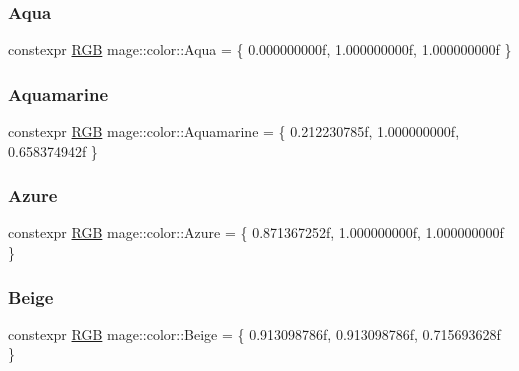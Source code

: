 \subsubsection{\texorpdfstring{Aqua}{Aqua}}
{\footnotesize\ttfamily constexpr \hyperlink{structmage_1_1_r_g_b}{R\+GB} mage\+::color\+::\+Aqua = \{ 0.\+000000000f, 1.\+000000000f, 1.\+000000000f \}}

\hypertarget{namespacemage_1_1color_aeb7c11e0c59678c6ddcc4e8379c5a951}{}\label{namespacemage_1_1color_aeb7c11e0c59678c6ddcc4e8379c5a951} 
\subsubsection{\texorpdfstring{Aquamarine}{Aquamarine}}
{\footnotesize\ttfamily constexpr \hyperlink{structmage_1_1_r_g_b}{R\+GB} mage\+::color\+::\+Aquamarine = \{ 0.\+212230785f, 1.\+000000000f, 0.\+658374942f \}}

\hypertarget{namespacemage_1_1color_a002c51cadb3b21c6a0c3492303207ee3}{}\label{namespacemage_1_1color_a002c51cadb3b21c6a0c3492303207ee3} 
\subsubsection{\texorpdfstring{Azure}{Azure}}
{\footnotesize\ttfamily constexpr \hyperlink{structmage_1_1_r_g_b}{R\+GB} mage\+::color\+::\+Azure = \{ 0.\+871367252f, 1.\+000000000f, 1.\+000000000f \}}

\hypertarget{namespacemage_1_1color_a26bfb42ab556acd93a90a8c16f0d6c28}{}\label{namespacemage_1_1color_a26bfb42ab556acd93a90a8c16f0d6c28} 
\subsubsection{\texorpdfstring{Beige}{Beige}}
{\footnotesize\ttfamily constexpr \hyperlink{structmage_1_1_r_g_b}{R\+GB} mage\+::color\+::\+Beige = \{ 0.\+913098786f, 0.\+913098786f, 0.\+715693628f \}}

\hypertarget{namespacemage_1_1color_a475426fc358c0aa9f4e222003a273a1d}{}\label{namespacemage_1_1color_a475426fc358c0aa9f4e222003a273a1d} 
